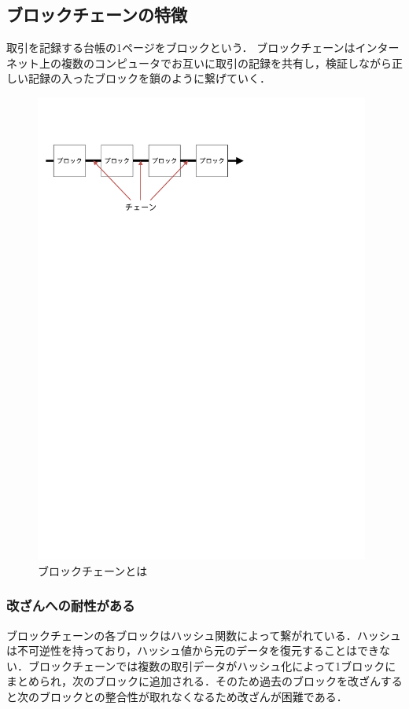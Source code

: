 \documentclass[a4j,12pt]{jsarticle}
\begin{document}
\subsection{ブロックチェーンの特徴}

取引を記録する台帳の1ページをブロックという．
ブロックチェーンはインターネット上の複数のコンピュータでお互いに取引の記録を共有し，検証しながら正しい記録の入ったブロックを鎖のように繋げていく．

\begin{figure}[H]
\centering
\includegraphics[mediaboxonly=/CropBox,width=11cm]{block1.pdf}
\caption{ブロックチェーンとは}
\label{fig:no}
\end{figure} 


\subsubsection{改ざんへの耐性がある}
ブロックチェーンの各ブロックはハッシュ関数によって繋がれている．ハッシュは不可逆性を持っており，ハッシュ値から元のデータを復元することはできない．ブロックチェーンでは複数の取引データがハッシュ化によって1ブロックにまとめられ，次のブロックに追加される．そのため過去のブロックを改ざんすると次のブロックとの整合性が取れなくなるため改ざんが困難である．
\end{document}
